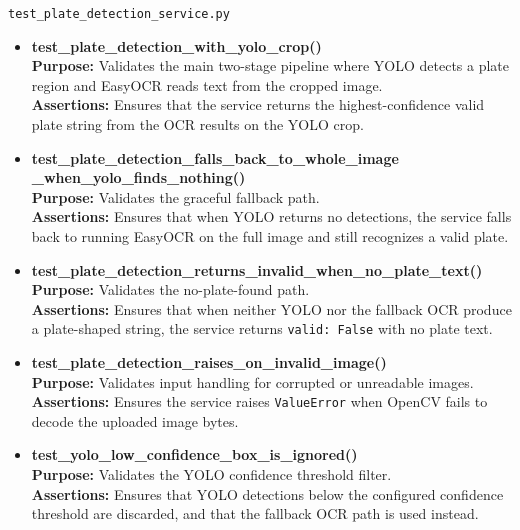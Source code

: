 \documentclass[12pt,a4paper,oneside]{report}
\begin{document}
\texttt{test\_plate\_detection\_service.py}
\begin{itemize}[leftmargin=2em]
    \item \textbf{test\_plate\_detection\_with\_yolo\_crop()} \\
    \textbf{Purpose:} Validates the main two-stage pipeline where YOLO detects a plate region and EasyOCR reads text from the cropped image. \\
    \textbf{Assertions:} Ensures that the service returns the highest-confidence valid plate string from the OCR results on the YOLO crop.

    \item \textbf{test\_plate\_detection\_falls\_back\_to\_whole\_image\\
    \_when\_yolo\_finds\_nothing()} \\
    \textbf{Purpose:} Validates the graceful fallback path. \\
    \textbf{Assertions:} Ensures that when YOLO returns no detections, the service falls back to running EasyOCR on the full image and still recognizes a valid plate.

    \item \textbf{test\_plate\_detection\_returns\_invalid\_when\_no\_plate\_text()} \\
    \textbf{Purpose:} Validates the no-plate-found path. \\
    \textbf{Assertions:} Ensures that when neither YOLO nor the fallback OCR produce a plate-shaped string, the service returns \texttt{valid: False} with no plate text.

    \item \textbf{test\_plate\_detection\_raises\_on\_invalid\_image()} \\
    \textbf{Purpose:} Validates input handling for corrupted or unreadable images. \\
    \textbf{Assertions:} Ensures the service raises \texttt{ValueError} when OpenCV fails to decode the uploaded image bytes.

    \item \textbf{test\_yolo\_low\_confidence\_box\_is\_ignored()} \\
    \textbf{Purpose:} Validates the YOLO confidence threshold filter. \\
    \textbf{Assertions:} Ensures that YOLO detections below the configured confidence threshold are discarded, and that the fallback OCR path is used instead.
\end{itemize}
\end{document}
